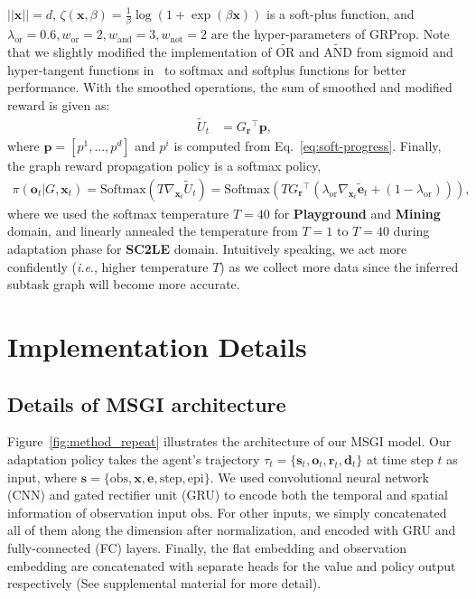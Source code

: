 \documentclass{article} \usepackage{iclr2020_conference,times}
\makeatletter
\newcommand{\softplus}{\zeta}
\newcommand{\nti}{{MSGI}}
\newcommand{\GR}{ G_{\mb{r}} }
\newcommand{\mb}{\mathbf}
\newcommand{\tb}{\textbf}
\newcommand{\wt}{\widetilde}
\DeclareRobustCommand\onedot{\futurelet\@let@token\@onedot}
\def\onedot{.}
\def\ie{\emph{i.e}\onedot} \def\Ie{\emph{I.e}\onedot}
\makeatother
\begin{document}
$||\mb{x}||=d$, $\softplus(\mb{x}, \beta)=\frac{1}{\beta} \log(1+\exp(\beta \mb{x}))$ is a soft-plus function, and $\lambda_{\text{or}}=0.6, w_{\text{or}}=2, w_{\text{and}}=3, w_{\text{not}}=2$ are the hyper-parameters of GRProp. 
Note that we slightly modified the implementation of $\wt{\text{OR}}$ and $\wt{\text{AND}}$ from sigmoid and hyper-tangent functions in~\citep{sohn2018hierarchical} to softmax and softplus functions for better performance. With the smoothed operations, the sum of smoothed and modified reward is given as:
\begin{align}
    \widetilde{U}_t &= \GR{}^\top \mb{p}, \label{eq:cr4}
\end{align}
where $\mb{p}=[p^1,\ldots,p^d]$ and $p^i$ is computed from Eq.~\ref{eq:soft-progress}.
Finally, the graph reward propagation policy is a softmax policy,  
\begin{align}
 \pi(\mb{o}_{t}|G,\mb{x}_t) =  \text{Softmax}\left(  T\nabla_{\mb{x}_{t}} \widetilde{U}_{t} \right)
 =\text{Softmax}\left( T\GR{}^\top (\lambda_{\text{or}}\nabla_{\mb{x}_{t}} \wt{\mb{e}}_{t}+ (1-\lambda_{\text{or}}) ) \right),
\end{align}
where we used the softmax temperature $T=40$ for \tb{Playground} and \tb{Mining} domain,
and linearly annealed the temperature from $T=1$ to $T=40$ during adaptation phase for \tb{SC2LE} domain.
Intuitively speaking, we act more confidently (\ie, higher temperature $T$) as we collect more data since the inferred subtask graph will become more accurate.


\clearpage
\section{Implementation Details}
\label{sec:appendix_implementation_details}

\subsection{Details of \nti{} architecture}
\label{sec:appendix_nti_architecture}

Figure~\ref{fig:method_repeat} illustrates the architecture of our \nti{} model.
Our adaptation policy takes the agent's trajectory $\tau_t=\{\mb{s}_t,\mb{o}_t,\mb{r}_t,\mb{d}_t\}$ at time step $t$ as input,
where $\mb{s}=\{ \text{obs}, \mb{x}, \mb{e}, \text{step}, \text{epi} \}$.
We used convolutional neural network (CNN) and gated rectifier unit (GRU) to encode both the temporal and spatial information of observation input $\text{obs}$. 
For other inputs, we simply concatenated all of them along the dimension after normalization, and encoded with GRU and fully-connected (FC) layers. Finally, the flat embedding and observation embedding are concatenated with separate heads for the value and policy output respectively (See supplemental material for more detail).
\end{document}
